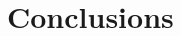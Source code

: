 \documentclass[11pt]{article} %
\begin{document}



\section{Conclusions}



\pagebreak


\begin{thebibliography}{99}
 
\end{thebibliography}

\end{document}
